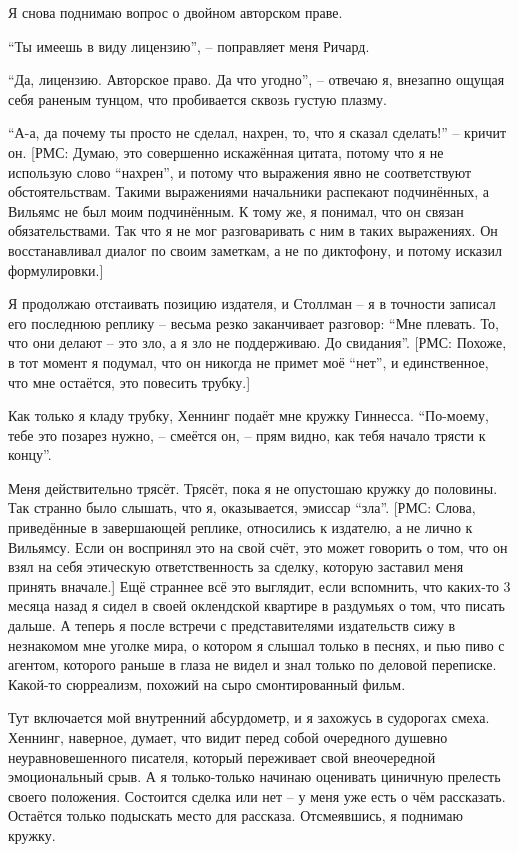 Я снова поднимаю вопрос о двойном авторском праве.

``Ты имеешь в виду лицензию'', -- поправляет меня Ричард.

``Да, лицензию. Авторское право. Да что угодно'', -- отвечаю я, внезапно ощущая себя раненым тунцом, что пробивается сквозь густую плазму.

``А-а, да почему ты просто не сделал, нахрен, то, что я сказал сделать!'' -- кричит он. [РМС: Думаю, это совершенно искажённая цитата, потому что я не использую слово ``нахрен'', и потому что выражения явно не соответствуют обстоятельствам. Такими выражениями начальники распекают подчинённых, а Вильямс не был моим подчинённым. К тому же, я понимал, что он связан обязательствами. Так что я не мог разговаривать с ним в таких выражениях. Он восстанавливал диалог по своим заметкам, а не по диктофону, и потому исказил формулировки.]

Я продолжаю отстаивать позицию издателя, и Столлман -- я в точности записал его последнюю реплику -- весьма резко заканчивает разговор: ``Мне плевать. То, что они делают -- это зло, а я зло не поддерживаю. До свидания''. [РМС: Похоже, в тот момент я подумал, что он никогда не примет моё ``нет'', и единственное, что мне остаётся, это повесить трубку.]

Как только я кладу трубку, Хеннинг подаёт мне кружку Гиннесса. ``По-моему, тебе это позарез нужно, -- смеётся он, -- прям видно, как тебя начало трясти к концу''.

Меня действительно трясёт. Трясёт, пока я не опустошаю кружку до половины. Так странно было слышать, что я, оказывается, эмиссар ``зла''. [РМС: Слова, приведённые в завершающей реплике, относились к издателю, а не лично к Вильямсу. Если он воспринял это на свой счёт, это может говорить о том, что он взял на себя этическую ответственность за сделку, которую заставил меня принять вначале.] Ещё страннее всё это выглядит, если вспомнить, что каких-то 3 месяца назад я сидел в своей оклендской квартире в раздумьях о том, что писать дальше. А теперь я после встречи с представителями издательств сижу в незнакомом мне уголке мира, о котором я слышал только в песнях, и пью пиво с агентом, которого раньше в глаза не видел и знал только по деловой переписке. Какой-то сюрреализм, похожий на сыро смонтированный фильм.

Тут включается мой внутренний абсурдометр, и я захожусь в судорогах смеха. Хеннинг, наверное, думает, что видит перед собой очередного душевно неуравновешенного писателя, который переживает свой внеочередной эмоциональный срыв. А я только-только начинаю оценивать циничную прелесть своего положения. Состоится сделка или нет -- у меня уже есть о чём рассказать. Остаётся только подыскать место для рассказа. Отсмеявшись, я поднимаю кружку.

